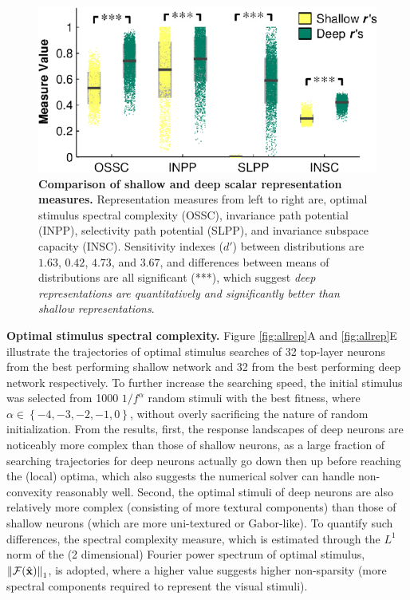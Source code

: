 \documentclass[10pt,twocolumn,letterpaper]{article}
\begin{document}
\begin{figure}
\begin{center}
\includegraphics[width=0.80\columnwidth]{Figs/fig5.pdf} 
\end{center}
\caption{{\bf Comparison of shallow and deep scalar representation measures.}
Representation measures from left to right are, optimal stimulus spectral complexity (OSSC), invariance path potential (INPP), selectivity path potential (SLPP), and invariance subspace capacity (INSC).
Sensitivity indexes ($d'$) between distributions are $1.63$, $0.42$, $4.73$, and $3.67$, and differences between means of distributions are all significant (***), which suggest \emph{deep representations are quantitatively and significantly better than shallow representations}.
} %
\label{fig:pair}
\end{figure}

{\bf Optimal stimulus spectral complexity.} Figure \ref{fig:allrep}A and \ref{fig:allrep}E illustrate the trajectories of optimal stimulus searches of 32 top-layer neurons from the best performing shallow network and 32 from the best performing deep network respectively.
To further increase the searching speed, the initial stimulus {was} selected from 1000 ${1}/{f^{\alpha}}$ random stimuli with the best fitness, where $\alpha \in \left\lbrace -4,-3,-2,-1,0 \right\rbrace$, without overly sacrificing the nature of random initialization.
From the results, first, the response landscapes of deep neurons are noticeably more complex than those of shallow neurons, as a large fraction of searching trajectories for deep neurons actually go down then up before reaching the (local) optima, which also suggests the numerical solver can handle non-convexity reasonably well.
Second, the optimal stimuli of deep neurons are also relatively more complex (\ie consisting of more textural components) than those of shallow neurons (which are more uni-textured or Gabor-like).
To quantify such differences, the spectral complexity measure, which is estimated through the $L^{1}$ norm of the (2 dimensional) Fourier power spectrum of optimal stimulus, \ie $\left\| \mathcal{F}(\hat{\bf{x}}) \right\|_{1}$, is adopted, where a higher value suggests higher non-sparsity (\ie more spectral components required to represent the visual stimuli).
\end{document}

